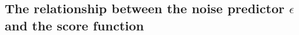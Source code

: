\subsection{The relationship between the noise predictor $\epsilon$ and the score function} \label{subsec:hat_epsilon_score}
